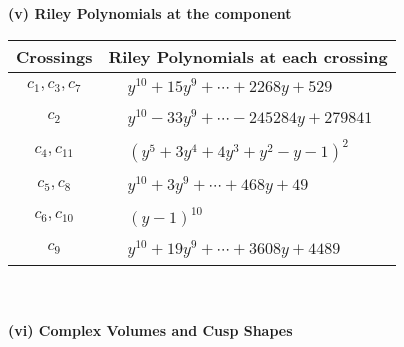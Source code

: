 \documentclass[1p]{elsarticle_modified}
\theoremstyle{definition}
\begin{document}
\newpage\renewcommand{\arraystretch}{1}
\flushleft \textbf{(v) Riley Polynomials at the component}\newline \\
\begin{tabular}{m{50pt}|m{274pt}}
Crossings & \hspace{64pt}Riley Polynomials at each crossing \\
\hline $$\begin{aligned}c_{1},c_{3},c_{7}\end{aligned}$$&$\begin{aligned}
&y^{10}+15 y^9+\cdots+2268 y+529
\end{aligned}$\\
\hline $$\begin{aligned}c_{2}\end{aligned}$$&$\begin{aligned}
&y^{10}-33 y^9+\cdots-245284 y+279841
\end{aligned}$\\
\hline $$\begin{aligned}c_{4},c_{11}\end{aligned}$$&$\begin{aligned}
&(y^5+3 y^4+4 y^3+y^2- y-1)^2
\end{aligned}$\\
\hline $$\begin{aligned}c_{5},c_{8}\end{aligned}$$&$\begin{aligned}
&y^{10}+3 y^9+\cdots+468 y+49
\end{aligned}$\\
\hline $$\begin{aligned}c_{6},c_{10}\end{aligned}$$&$\begin{aligned}
&(y-1)^{10}
\end{aligned}$\\
\hline $$\begin{aligned}c_{9}\end{aligned}$$&$\begin{aligned}
&y^{10}+19 y^9+\cdots+3608 y+4489
\end{aligned}$\\
\hline
\end{tabular}\\~\\
\newpage\flushleft \textbf{(vi) Complex Volumes and Cusp Shapes}
\end{document}
